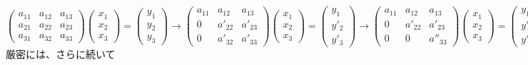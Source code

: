 \documentclass[dvipdfmx]{jsarticle}
\begin{document}
\[\begin{pmatrix}a_{11}&a_{12}&a_{13}\\a_{21}&a_{22}&a_{23}\\a_{31}&a_{32}&a_{33}\end{pmatrix}\begin{pmatrix}x_1\\x_2\\x_3\end{pmatrix}=\begin{pmatrix}y_1\\y_2\\y_3\end{pmatrix}\to\begin{pmatrix}a_{11}&a_{12}&a_{13}\\0&a'_{22}&a'_{23}\\0&a'_{32}&a'_{33}\end{pmatrix}\begin{pmatrix}x_1\\x_2\\x_3\end{pmatrix}=\begin{pmatrix}y_1\\y'_2\\y'_3\end{pmatrix}\to\begin{pmatrix}a_{11}&a_{12}&a_{13}\\0&a'_{22}&a'_{23}\\0&0&a''_{33}\end{pmatrix}\begin{pmatrix}x_1\\x_2\\x_3\end{pmatrix}=\begin{pmatrix}y_1\\y'_2\\y''_3\end{pmatrix}\]
厳密には、さらに続いて
\end{document}
